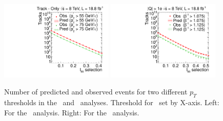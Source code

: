 \begin{figure}
\centering
  \includegraphics[clip=false, trim=0.0cm 0cm 0.0cm 0cm, width=0.48\textwidth]{figures/tkonly/Prediction_Data8TeV_NPredVsNObs}
  \includegraphics[clip=false, trim=0.0cm 0cm 0.0cm 0cm, width=0.48\textwidth]{figures/multi/Prediction_Data8TeV_NPredVsNObs}
  \caption[Number of predicted and observed events for two different thresholds in the \tkonly\ and \multi\ analyses.]
{Number of predicted and observed events for two different $p_T$ thresholds in the \tkonly\ and \multi\ analyses. Threshold for \ias\ set by X-axis.
Left: For the \tkonly\ analysis. Right: For the \multi\ analysis.}
    \label{fig:PredMF}
\end{figure}


